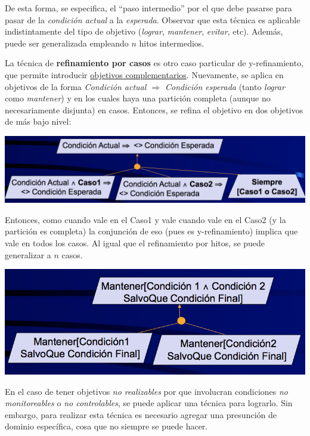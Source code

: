 \documentclass[]{article}
\begin{document}
De esta forma, se especifica, el ``paso intermedio'' por el que debe pasarse para pasar de la \textit{condición actual} a la \textit{esperada}. Observar que esta técnica es aplicable indistintamente del tipo de objetivo (\textit{lograr}, \textit{mantener}, \textit{evitar}, etc). Además, puede ser generalizada empleando $n$ hitos intermedios.

La técnica de \textbf{refinamiento por casos} es otro caso particular de y-refinamiento, que permite introducir \underline{objetivos complementarios}. Nuevamente, se aplica en objetivos de la forma \textit{Condición actual $\Rightarrow$ Condición esperada} (tanto \textit{lograr} como \textit{mantener}) y en los cuales haya una partición completa (aunque no necesariamente disjunta) en casos. Entonces, se refina el objetivo en dos objetivos de más bajo nivel:

\begin{center}
	\includegraphics[scale=0.35]{Casos.png}
\end{center}

Entonces, como cuando vale en el Caso1 y vale cuando vale en el Caso2 (y la partición es completa) la conjunción de eso (pues es y-refinamiento) implica que vale en todos los casos. Al igual que el refinamiento por hitos, se puede generalizar a $n$ casos.

\begin{center}
	\includegraphics[scale=0.4]{DyC.png}
\end{center}

En el caso de tener objetivos \textit{no realizables} por que involucran condiciones \textit{no monitoreables} o \textit{no controlables}, se puede aplicar una técnica para lograrlo. Sin embargo, para realizar esta técnica es necesario agregar una presunción de dominio específica, cosa que no siempre se puede hacer.
\end{document}
